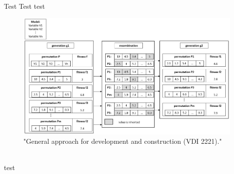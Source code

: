 Test
Test
test
\begin{figure}[h]
    \centering
    \includegraphics[scale=0.5]{pics/evol_alg.PNG}
    \caption{\label{pic:evol_alg} "General approach for development and construction (VDI 2221)." \cite{Jansch2006THEDO}}
\end{figure}\\
test
